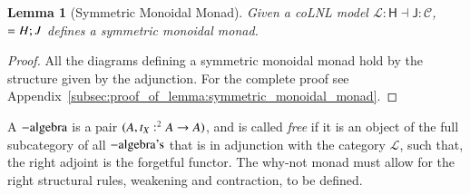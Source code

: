 \documentclass{lmcs}
\newtheorem{lemma}[theorem]{Lemma}
\let\mto\to
\let\to\relax
\newcommand{\to}{\rightarrow}
\let\wn\relax
\newcommand{\cat}[1]{\mathcal{#1}}
\newcommand{\func}[1]{\mathsf{#1}}
\newcommand{\wn}[0]{\mathop{?}}
\begin{document}
\begin{lemma}[Symmetric Monoidal Monad]
  \label{lemma:symmetric_monoidal_monad}
  Given a coLNL model $\cat{L} : \func{H} \dashv \func{J} : \cat{C}$,
  $\wn = H;J$ defines a symmetric monoidal monad.
\end{lemma}
\begin{proof}
  All the diagrams defining a symmetric monoidal monad hold by the
  structure given by the adjunction.  For the complete proof see
  Appendix~\ref{subsec:proof_of_lemma:symmetric_monoidal_monad}.
\end{proof}

A $\wn-\text{algebra}$ is a pair $(\wn A, t_X : \wn^2 A \mto \wn A)$,
and is called \textit{free} if it is an object of the full subcategory
of all $\wn-\text{algebra's}$ that is in adjunction with the category
$\cat{L}$, such that, the right adjoint is the forgetful functor.  The
why-not monad must allow for the right structural rules, weakening and
contraction, to be defined.
\end{document}
